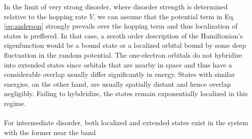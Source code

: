 \documentclass[10pt,a4paper]{article}
\begin{document}
\noindent 
\begin{minipage}[t]{0.58\textwidth}
\noindent In the limit of very strong disorder, where disorder strength is determined relative to the hopping rate $V$, we can assume that the potential term in Eq. \eqref{eq:anderson} strongly prevails over the hopping term and thus localization of states is preffered. In that case, a zeroth order description of the Hamiltonian's eigenfunction would be a bound state or a localized orbital bound by some deep fluctuation in the random potential. The one-electron orbitals do not hybridize into extended states since orbitals that are nearby in space and thus
have a considerable overlap usually differ significantly in energy. States with similar energies, on the other hand, are usually spatially distant and hence overlap negligibly. Failing to hybdridize, the states remain exponentially localized in this regime. \\\\
\noindent For intermediate disorder, both localized and extended states exist in the system with the former near the band  
\end{minipage}\hfill
\end{document}
